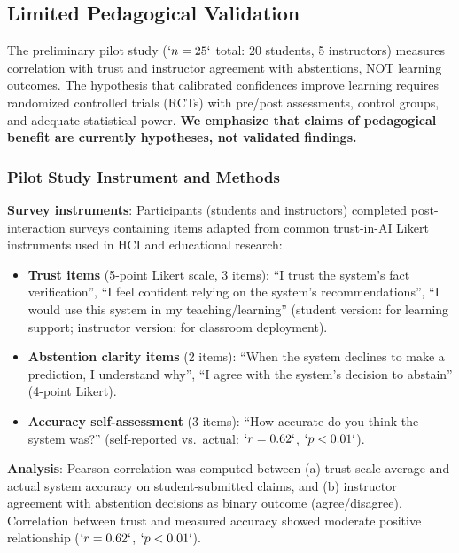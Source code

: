 \subsection{Limited Pedagogical Validation}\label{limited-pedagogical-validation}

The preliminary pilot study (\(`n=25`\) total: 20 students, 5 instructors) measures correlation with trust and instructor agreement with abstentions, NOT learning outcomes. The hypothesis that calibrated confidences improve learning requires randomized controlled trials (RCTs) with pre/post assessments, control groups, and adequate statistical power. \textbf{We emphasize that claims of pedagogical benefit are currently hypotheses, not validated findings.}

\subsubsection{Pilot Study Instrument and Methods}\label{pilot-study-instrument-and-methods}

\textbf{Survey instruments}: Participants (students and instructors) completed post-interaction surveys containing items adapted from common trust-in-AI Likert instruments used in HCI and educational research:

\begin{itemize}
\item
  \textbf{Trust items} (5-point Likert scale, 3 items): ``I trust the system's fact verification'', ``I feel confident relying on the system's recommendations'', ``I would use this system in my teaching/learning'' (student version: for learning support; instructor version: for classroom deployment).
\item
  \textbf{Abstention clarity items} (2 items): ``When the system declines to make a prediction, I understand why'', ``I agree with the system's decision to abstain'' (4-point Likert).
\item
  \textbf{Accuracy self-assessment} (3 items): ``How accurate do you think the system was?'' (self-reported vs.~actual: \(`r=0.62`\), \(`p<0.01`\)).
\end{itemize}

\textbf{Analysis}: Pearson correlation was computed between (a) trust scale average and actual system accuracy on student-submitted claims, and (b) instructor agreement with abstention decisions as binary outcome (agree/disagree). Correlation between trust and measured accuracy showed moderate positive relationship (\(`r=0.62`\), \(`p<0.01`\)).

